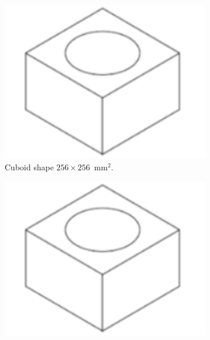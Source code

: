 \begin{figure}[!h]
\centering
\begin{subfigure}[t]{0.2\textwidth}
  \centering
  \includegraphics[height=0.8\textwidth]{SNdemonstrator/fig_SNdemonstrator/square_shape.pdf}
  \captionsetup{justification=centering}
  \caption{Cuboid shape $256\times256$~mm$^{2}$.
    \label{subfig:square_shape}}
\end{subfigure}
\hfill
\begin{subfigure}[t]{0.2\textwidth}
  \centering
  \includegraphics[height=0.8\textwidth]{SNdemonstrator/fig_SNdemonstrator/square_shape.pdf}
  \captionsetup{justification=centering}

\end{subfigure}
\end{figure}

